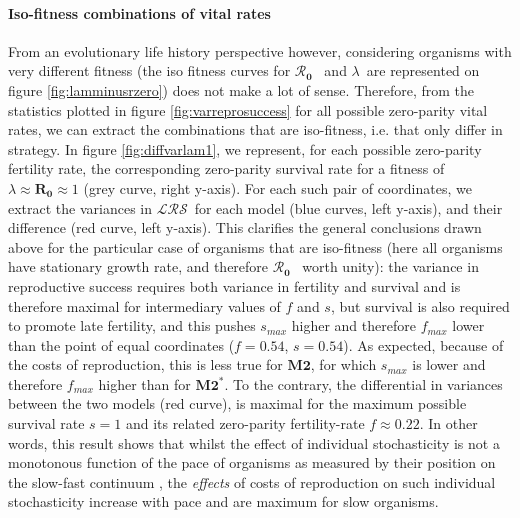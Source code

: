 \documentclass[10pt,a4paper]{article}
\newcommand{\lam}{$\lambda$}
\newcommand{\Rzero}{$\boldsymbol{\mathcal{R}_{0}}$  }
\newcommand{\LRO}{$\mathcal{LRS}$}
\begin{document}


\paragraph{Iso-fitness combinations of vital rates} From an evolutionary life history perspective however, considering organisms with very different fitness (the iso fitness curves for \Rzero\ and \lam\ are represented on figure \ref{fig:lamminusrzero}) does not make a lot of sense. 
Therefore, from the statistics plotted in figure \ref{fig:varreprosuccess} for all possible zero-parity vital rates, we can extract the combinations that are iso-fitness, i.e. that only differ in strategy. In figure \ref{fig:diffvarlam1}, we represent, for each possible zero-parity fertility rate, the corresponding zero-parity survival rate for a fitness of $\lambda \approx \mathbf{R_{0}}\approx 1$ (grey curve, right y-axis). For each such pair of coordinates, we extract the variances in \LRO\ for each model (blue curves, left y-axis), and their difference (red curve, left y-axis).
This clarifies the general conclusions drawn above for the particular case of organisms that are iso-fitness (here all organisms have stationary growth rate, and therefore \Rzero\ worth unity): the variance in reproductive success requires both variance in fertility and survival and is therefore maximal for intermediary values of $f$ and $s$, but survival is also required to promote late fertility, and this pushes $s_{max}$ higher and therefore $f_{max}$ lower than the point of equal coordinates ($f=0.54$, $s=0.54$). 
As expected, because of the costs of reproduction, this is less true for $\mathbf{M2}$, for which $s_{max}$ is lower and therefore $f_{max}$ higher than for $\mathbf{M2^{*}}$. To the contrary, the differential in variances between the two models (red curve), is maximal for the maximum possible survival rate $s=1$ and its related zero-parity fertility-rate $f\approx 0.22$. In other words, this result shows that whilst the effect of individual stochasticity is not a monotonous function of the pace of organisms as measured by their position on the slow-fast continuum \citep{Gaillard1989,Stearns1983} , the \emph{effects} of costs of reproduction on such individual stochasticity increase with pace and are maximum for slow organisms.\\
\end{document}
